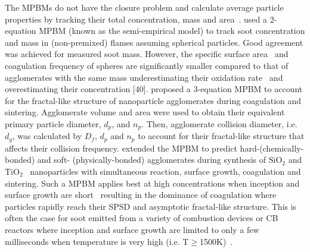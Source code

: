 The MPBMs do not have the closure problem and calculate average particle properties by tracking their total concentration, mass \citep{kruis1993simple} and area~\citep{tsantilis2004soft, lindstedt1994simplified}. \citet{kruis1993simple} used a 2-equation MPBM (known as the semi-empirical model) to track soot concentration and mass in (non-premixed) flames assuming spherical particles. Good agreement was achieved for measured soot mass. However, the specific surface area~\citep{lindstedt1994simplified} and coagulation frequency of spheres are significantly smaller compared to that of agglomerates with the same mass underestimating their oxidation rate~\citep{kelesidis2019estimating} and overestimating their concentration [40]. \citet{kruis1993simple} proposed a 3-equation MPBM to account for the fractal-like structure of nanoparticle agglomerates during coagulation and sintering. Agglomerate volume and area were used to obtain their equivalent primary particle diameter, ${d_p}$, and ${n_p}$. Then, agglomerate collision diameter, i.e. ${d_g}$, was calculated by ${D_f}$, ${d_p}$ and ${n_p}$ to account for their fractal-like structure that affects their collision frequency. \citet{tsantilis2004soft} extended the MPBM to predict hard-(chemically-bonded) and soft- (physically-bonded) agglomerates during synthesis of $\mathrm{SiO_2}$ and $\mathrm{TiO_2}$~\citep{grass2006design} nanoparticles with simultaneous reaction, surface growth, coagulation and sintering. Such a MPBM applies best at high concentrations when inception and surface growth are short~\citep{Spicer2002} resulting in the dominance of coagulation where particles rapidly reach their SPSD and asymptotic fractal-like structure. This is often the case for soot emitted from a variety of combustion devices or CB reactors where inception and surface growth are limited to only a few milliseconds when temperature is very high (i.e. T$\ge$1500K)~\citep{kholghy2018reactive}.

